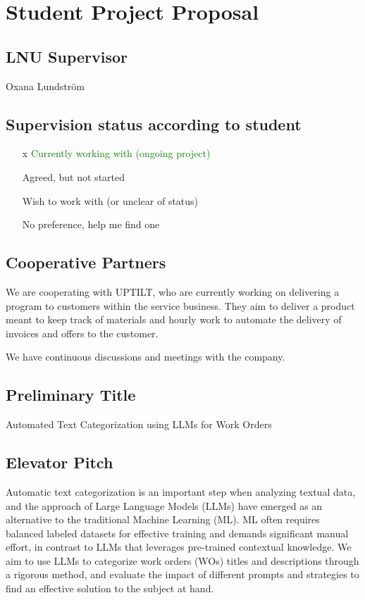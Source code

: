 \section{Student Project Proposal}

\subsection{LNU Supervisor}
Oxana Lundström

\subsection{Supervision status according to student}

\begin{itemize}
    \item[x] \textcolor{green}{Currently working with (ongoing project)}

    \item[ ] Agreed, but not started

    \item[ ] Wish to work with (or unclear of status)

    \item[ ] No preference, help me find one
\end{itemize}

\subsection{Cooperative Partners}

We are cooperating with UPTILT, who are currently working on delivering a
program to customers within the service business. They aim to deliver a product meant
to keep track of materials and hourly work to automate the delivery of invoices and
offers to the customer.

We have continuous discussions and meetings with the company.

\subsection{Preliminary Title}

Automated Text Categorization using LLMs for Work Orders

\subsection{Elevator Pitch}

Automatic text categorization is an important step when analyzing textual data, and
the approach of Large Language Models (LLMs) have emerged as an alternative to the
traditional Machine Learning (ML). ML often requires balanced labeled datasets
for effective training and demands significant manual effort, in contrast to LLMs
that leverages pre-trained contextual knowledge. We aim to use LLMs to
categorize work orders (WOs) titles and descriptions through a rigorous method, and
evaluate the impact of different prompts and strategies to find an effective solution
to the subject at hand.

